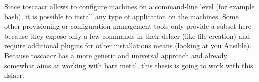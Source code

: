 \newline
Since \gls{toscaacr} allows to configure machines on a command-line level (for example bash), it is possible to install any type of application on the machines. Some other provisioning or configuration management tools only provide a subset here because they expose only a few commands in their \gls{dslacr} (like file-creation) and require additional plugins for other installations means (looking at you Ansible).
\newline
Because \gls{toscaacr} has a more generic and universal approach and already somewhat aims at working with bare metal, this thesis is going to work with this \gls{dslacr}.


